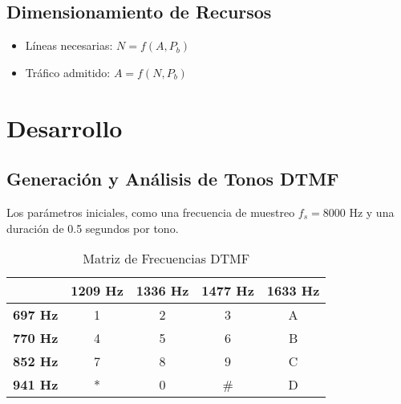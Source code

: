 \documentclass[journal]{IEEEtran} %
\begin{document}
\subsection{Dimensionamiento de Recursos}
\begin{itemize}
    \item Líneas necesarias: $N = f(A, P_b)$
    \item Tráfico admitido: $A = f(N, P_b)$
\end{itemize}

\section{Desarrollo}


\subsection{Generación y Análisis de Tonos DTMF}\label{AA}
Los parámetros iniciales, como una frecuencia de muestreo $f_s=8000$ Hz y una duración de 0.5 segundos por tono.

\begin{table}[htbp]
    \caption{Matriz de Frecuencias DTMF}
    \begin{center}
        \begin{tabular}{|c|c|c|c|c|}
            \hline
            \textbf{} & \textbf{1209 Hz} & \textbf{1336 Hz} & \textbf{1477 Hz} & \textbf{1633 Hz} \\
            \hline
            \textbf{697 Hz} & 1 & 2 & 3 & A \\
            \hline
            \textbf{770 Hz} & 4 & 5 & 6 & B \\
            \hline
            \textbf{852 Hz} & 7 & 8 & 9 & C \\
            \hline
            \textbf{941 Hz} & * & 0 & \# & D \\
            \hline
        \end{tabular}
        \label{tab:dtmf}
    \end{center}
\end{table}
\end{document}
